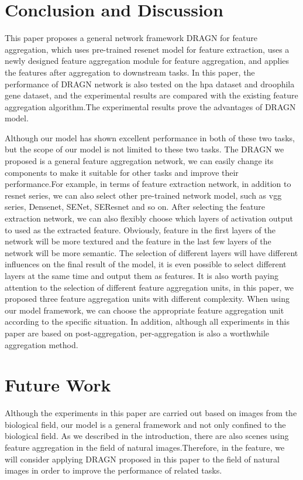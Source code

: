 \documentclass[10pt,twocolumn,letterpaper]{article}
\begin{document}
\section{Conclusion and Discussion}
This paper proposes a general network framework DRAGN for feature aggregation, which uses pre-trained resenet model for feature extraction, uses a newly designed feature aggregation module for feature aggregation, and applies the features after aggregation to downstream tasks. In this paper, the performance of DRAGN network is also tested on the hpa dataset and droophila gene dataset, and the experimental results are compared with the existing feature aggregation algorithm.The experimental results prove the advantages of DRAGN model.

Although our model has shown excellent performance in both of these two tasks, but the scope of our model is not limited to these two tasks. The DRAGN we proposed is a general feature aggregation network, we can easily change its components to make it suitable for other tasks and improve their performance.For example, in terms of feature extraction network, in addition to resnet series, we can also select other pre-trained network model, such as vgg series, Densenet, SENet, SEResnet and so on. After selecting the feature extraction network, we can also flexibly choose which layers of activation output to used as the extracted feature. Obviously, feature in the first layers of the network will be more textured and the feature in the last few layers of the network will be more semantic. The selection of different layers will have different influences on the final result of the model, it is even possible to select different layers at the same time and output them as features. It is also worth paying attention to the selection of different feature aggregation units, in this paper, we proposed three feature aggregation units with different complexity. When using our model framework, we can choose the appropriate feature aggregation unit according to the specific situation. In addition, although all experiments in this paper are based on post-aggregation, per-aggregation is also a worthwhile aggregation method.

\section{Future Work}
Although the experiments in this paper are carried out based on images from the biological field, our model is a general framework and not only confined to the biological field. As we described in the introduction, there are also scenes using feature aggregation in the field of natural images.Therefore, in the feature, we will consider applying DRAGN proposed in this paper to the field of natural images in order to improve the performance of related tasks.
\end{document}
